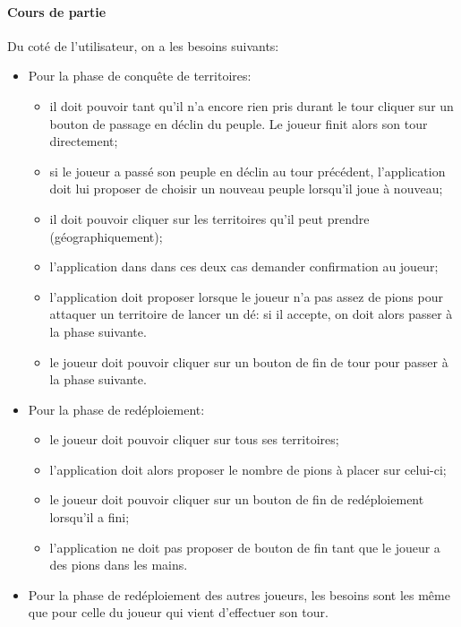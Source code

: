 \documentclass[a4paper, 11pt]{article}
\begin{document}
			\paragraph{Cours de partie\\}
			
			Du coté de l'utilisateur, on a les besoins suivants:\\
			\begin{itemize}
				\item Pour la phase de conquête de territoires:
				\begin{itemize}
					\item il doit pouvoir tant qu'il n'a encore rien pris durant le tour cliquer sur un bouton de passage en déclin du peuple. Le joueur finit alors son tour directement;
					\item si le joueur a passé son peuple en déclin au tour précédent, l'application doit lui proposer de choisir un nouveau peuple lorsqu'il joue à nouveau;
					\item il doit pouvoir cliquer sur les territoires qu'il peut prendre (géographiquement);
					\item l'application dans dans ces deux cas demander confirmation au joueur;
					\item l'application doit proposer lorsque le joueur n'a pas assez de pions pour attaquer un territoire de lancer un dé: si il accepte, on doit alors passer à la phase suivante.
					\item le joueur doit pouvoir cliquer sur un bouton de fin de tour pour passer à la phase suivante. \\
				\end{itemize}
				\item Pour la phase de redéploiement:
				\begin{itemize}
					\item le joueur doit pouvoir cliquer sur tous ses territoires;
					\item l'application doit alors proposer le nombre de pions à placer sur celui-ci;
					\item le joueur doit pouvoir cliquer sur un bouton de fin de redéploiement lorsqu'il a fini;
					\item l'application ne doit pas proposer de bouton de fin tant que le joueur a des pions dans les mains. \\
				\end{itemize}
				\item Pour la phase de redéploiement des autres joueurs, les besoins sont les même que pour celle du joueur qui vient d'effectuer son tour.	 \\	
			\end{itemize}
\end{document}
